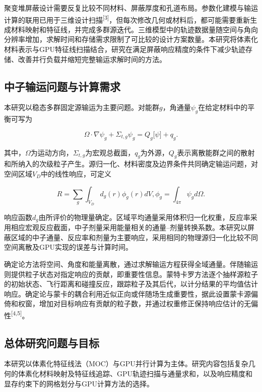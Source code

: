 \documentclass[UTF8, zihao=-4, fontset=none, a4paper]{ctexart}
\newcommand{\upcite}[1]{\textsuperscript{[#1]}}
\begin{document}
聚变堆屏蔽设计需要反复比较不同材料、屏蔽厚度和孔道布局。参数化建模与输运计算的联用已用于三维设计扫描\upcite{3}，但每次修改几何或材料后，都可能需要重新生成材料映射和特征线，并完成多群源迭代。三维模型中的轨迹数据量随空间与角向分辨率增加，求解时间和存储需求限制了可比较的设计方案数量。本研究将体素化材料表示与GPU特征线扫描结合，研究在满足屏蔽响应精度的条件下减少轨迹存储、改善并行负载并缩短完整输运求解时间的方法。

\subsection{中子输运问题与计算需求}

本研究以稳态多群固定源输运为主要问题。对能群\(g\)，角通量\(\psi_{g}\)在给定材料中的平衡可写为

\begin{equation}
\Omega \cdot \nabla\psi_{g} + \Sigma_{t,g}\psi_{g} = Q_{g}\lbrack\psi\rbrack + q_{g}.
\label{eq:1}
\end{equation}

其中，\(\Omega\)为运动方向，\(\Sigma_{t,g}\)为宏观总截面，\(q_{g}\)为外源，\(Q_{g}\)表示离散能群之间的散射和所纳入的次级粒子产生。源归一化、材料密度及边界条件共同确定输运问题，对空间区域\(V_{D}\)中的线性响应，可定义

\begin{equation}
R = \sum_{g}^{}{\int_{V_{D}}^{}{d_{g}(r)\phi_{g}(r)dV}},\phi_{g} = \int_{4\pi}^{}{\psi_{g}d\Omega}.
\label{eq:2}
\end{equation}

响应函数\(d_g\)由所评价的物理量确定。区域平均通量采用体积归一化权重，反应率采用相应宏观反应截面，中子剂量采用能量相关的通量--剂量转换系数。本研究以屏蔽区域的中子通量、反应率和剂量为主要响应，采用相同的物理源归一化比较不同空间离散及GPU实现的误差与计算时间。

确定论方法将空间、角度和能量离散，通过求解输运方程获得全域通量。伴随输运则提供粒子状态对指定响应的贡献，即重要性信息。蒙特卡罗方法逐个抽样源粒子的初始状态、飞行距离和碰撞反应，跟踪粒子及其后代，以计分结果的平均值估计响应。确定论与蒙卡的耦合利用近似正向或伴随场生成重要性，据此设置蒙卡源偏倚和权窗，增加对目标响应有贡献的粒子数，并通过权重修正保持响应估计的无偏性\upcite{4,5}。

\subsection{总体研究问题与目标}

本研究以体素化特征线法（MOC）与GPU并行计算为主体。研究内容包括复杂几何的体素化材料映射及特征线追踪、GPU轨迹扫描与通量求和，以及响应精度和显存约束下的网格划分与GPU计算方法的选择。
\end{document}
